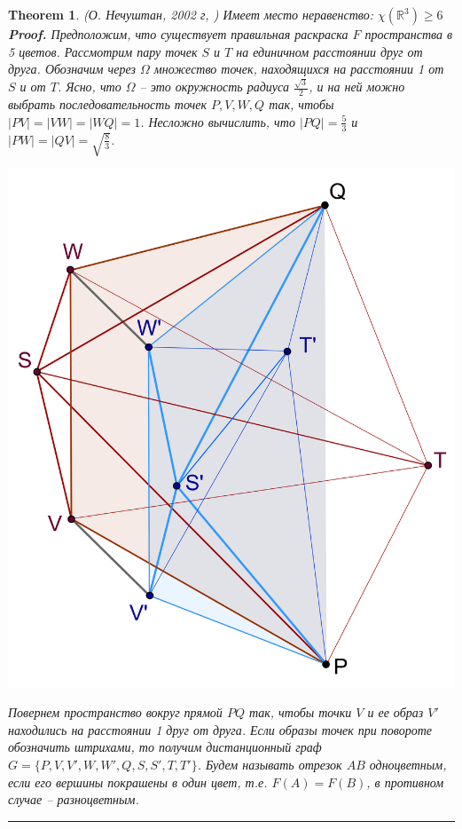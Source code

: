 \documentclass{report}%
\newtheorem{theorem}{Theorem}
\newenvironment{proof}[1][Proof]{\textbf{#1.} }{\ \rule{0.5em}{0.5em}}
\begin{document}
\begin{theorem} (О. Нечуштан, 2002 г, \cite{Nechushtan2002})
		Имеет место неравенство: $\chi(\mathbb{R}^3) \geq 6$ \\
		\begin{proof}
				Предположим, что существует правильная раскраска $F$ пространства в 5 цветов. 
				Рассмотрим пару точек $S$ и $T$ на единичном расстоянии друг от друга.
				Обозначим через $\Omega$ множество точек, находящихся на расстоянии 1 от $S$ и от $T$.
				Ясно, что $\Omega$ – это окружность радиуса $\frac{\sqrt{3}}{2}$, и на ней можно выбрать последовательность точек
				$P, V, W, Q$ так, чтобы $|PV| = |VW| = |WQ| = 1$. Несложно вычислить,
				что $|PQ| = \frac{5}{3}$  и  $|PW| = |QV| = \sqrt{\frac{8}{3}}$. \\
				\begin{center}
						\includegraphics[scale = 0.25]{nechushtan}
				\end{center}
			
			  Повернем пространство вокруг прямой $PQ$ так, чтобы точки $V$ и ее образ $V'$
				находились на расстоянии 1 друг от друга. Если образы точек при повороте обозначить штрихами,
				то получим дистанционный граф $G = \{P, V, V', W, W' ,Q, S, S', T, T'\}$.
				Будем называть отрезок $AB$ одноцветным, если его вершины покрашены в один цвет,
				т.е. $F(A) = F(B)$, в противном случае – разноцветным.
		\end{proof}
\end{theorem}
\end{document}
